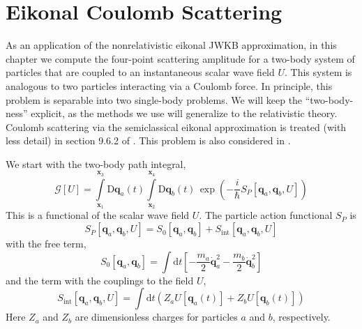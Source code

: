 \chapter{Eikonal Coulomb Scattering\label{ChCoulomb}}
As an application of the nonrelativistic eikonal JWKB approximation, in this chapter we compute the four-point scattering amplitude for a two-body system of particles that are coupled to an instantaneous scalar wave field $U$. This system is analogous to two particles interacting via a Coulomb force. In principle, this problem is separable into two single-body problems. We will keep the ``two-body-ness'' explicit, as the methods we use will generalize to the relativistic theory. Coulomb scattering via the semiclassical eikonal approximation is treated (with less detail) in section 9.6.2 of \cite{ZinnJustin}. This problem is also considered in \cite{Glauber}.

We start with the two-body path integral,
\begin{equation}
	\mathcal{G}[U] = \int\limits_{\mathbf{x}_{1}}^{\mathbf{x}_{3}} \mathrm{D}\mathbf{q}_{a}(t) \int\limits_{\mathbf{x}_{2}}^{\mathbf{x}_{4}} \mathrm{D}\mathbf{q}_{b}(t) \, \exp{\left( - \frac{i}{\hbar} S_{P}[ \mathbf{q}_{a}, \mathbf{q}_{b}, U] \right)}
\end{equation}
This is a functional of the scalar wave field $U$. The particle action functional $S_{P}$ is
\begin{equation}
	S_{P}[ \mathbf{q}_{a}, \mathbf{q}_{b}, U] = S_{0}[ \mathbf{q}_{a}, \mathbf{q}_{b}] + S_{\text{int}}[ \mathbf{q}_{a}, \mathbf{q}_{b}, U]
\end{equation}
with the free term,
\begin{equation}
	S_{0}[ \mathbf{q}_{a}, \mathbf{q}_{b}] = \int \mathrm{d}t \left[ -\frac{m_{a}}{2} \dot{\mathbf{q}}_{a}^{2} - \frac{m_{b}}{2} \dot{\mathbf{q}}_{b}^{2} \right]
\end{equation}
and the term with the couplings to the field $U$,
\begin{equation}
	S_{\text{int}}[ \mathbf{q}_{a}, \mathbf{q}_{b}, U] = \int \mathrm{d}t \left( Z_{a} U[\mathbf{q}_{a}(t)] + Z_{b} U[\mathbf{q}_{b}(t)] \right) \label{SIntU}
\end{equation}
Here $Z_{a}$ and $Z_{b}$ are dimensionless charges for particles $a$ and $b$, respectively.


